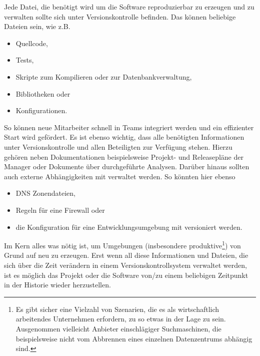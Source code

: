 Jede Datei, die benötigt wird um die Software reproduzierbar zu erzeugen und zu
verwalten sollte sich unter Versionskontrolle befinden. Das können beliebige
Dateien sein, wie z.B.

\begin{itemize}
\item Quellcode,
\item Tests,
\item Skripte zum Kompilieren oder zur Datenbankverwaltung,
\item Bibliotheken oder
\item Konfigurationen.
\end{itemize}

So können neue Mitarbeiter schnell in Teams integriert werden und ein
effizienter Start wird gefördert. Es ist ebenso wichtig, dass alle benötigten
Informationen unter Versionskontrolle und allen Beteiligten zur Verfügung
stehen. Hierzu gehören neben Dokumentationen beispielsweise Projekt- und
Releasepläne der Manager oder Dokumente über durchgeführte Analysen. Darüber
hinaus sollten auch externe Abhängigkeiten mit verwaltet werden. So könnten
hier ebenso

\begin{itemize}
\item DNS Zonendateien,
\item Regeln für eine Firewall oder
\item die Konfiguration für eine Entwicklungsumgebung mit versioniert werden.
\end{itemize}

Im Kern alles was nötig ist, um Umgebungen (insbesondere produktive\footnote{Es
gibt sicher eine Vielzahl von Szenarien, die es als wirtschaftlich arbeitendes
Unternehmen erfordern, zu so etwas in der Lage zu sein. Ausgenommen vielleicht
Anbieter einschlägiger Suchmaschinen, die beispielsweise nicht vom Abbrennen
eines einzelnen Datenzentrums abhängig sind.}) von Grund auf neu zu erzeugen.
Erst wenn all diese Informationen und Dateien, die sich über die Zeit
verändern in einem Versionskontrollsystem verwaltet werden, ist es möglich das
Projekt oder die Software von/zu einem beliebigen Zeitpunkt in der Historie
wieder herzustellen.\cite[S.~33]{cd}

